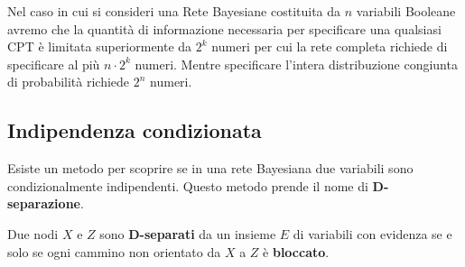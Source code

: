 Nel caso in cui si consideri una Rete Bayesiane costituita da $n$ variabili
Booleane avremo che la quantità di informazione necessaria per specificare una
qualsiasi CPT è limitata superiormente da $2^k$ numeri per cui la rete completa
richiede di specificare al più $n \cdot 2^k$ numeri. Mentre specificare l'intera
distribuzione congiunta di probabilità richiede $2^n$ numeri.
\subsection{Indipendenza condizionata}
Esiste un metodo per scoprire se in una rete Bayesiana due variabili sono
condizionalmente indipendenti. Questo metodo prende il nome di \textbf{D-separazione}.
\begin{definizione}
    Due nodi $X$ e $Z$ sono \textbf{D-separati} da un insieme $E$ di variabili con
    evidenza se e solo se ogni cammino non orientato da $X$ a $Z$ è \textbf{bloccato}.
\end{definizione}
